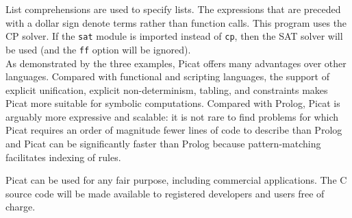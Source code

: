 \documentclass{article}[12pt]
\begin{document}
\large{\indent List comprehensions are used to specify lists. The expressions that
are preceded with a dollar sign denote terms rather than function
calls. This program uses the CP solver. If the \texttt{sat} module is imported
instead of \texttt{cp}, then the SAT solver will be used (and the \texttt{ff} option
will be ignored).}
\\

\large{\indent As demonstrated by the three examples, Picat offers many advantages
over other languages. Compared with functional and scripting
languages, the support of explicit unification, explicit
non-determinism, tabling, and constraints makes Picat more suitable
for symbolic computations. Compared with Prolog, Picat is arguably
more expressive and scalable: it is not rare to find problems for
which Picat requires an order of magnitude fewer lines of code to
describe than Prolog and Picat can be significantly faster than
Prolog because pattern-matching facilitates indexing of rules. }

\large{\indent Picat can be used for any fair purpose, including commercial
applications. The C source code will be made available to registered
developers and users free of charge. }
\end{document}
